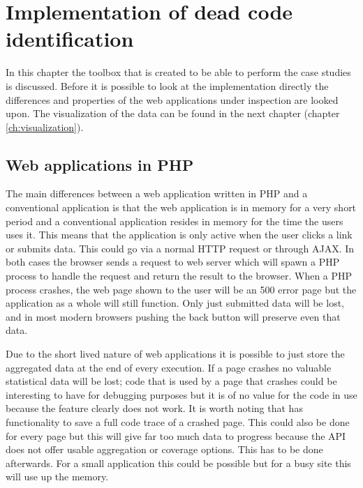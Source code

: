\chapter{Implementation of dead code identification}
\label{ch:implementation}

In this chapter the toolbox that is created to be able to perform the case studies is discussed. Before it is possible to look at the implementation directly the differences and properties of the web applications under inspection are looked upon. The visualization of the data can be found in the next chapter (chapter \ref{ch:visualization}).

\section{Web applications in PHP}

The main differences between a web application written in PHP and a conventional application is that the web application is in memory for a very short period and a conventional application resides in memory for the time the users uses it. This means that the application is only active when the user clicks a link or submits data. This could go via a normal HTTP request or through AJAX\cite{garrett2005}. In both cases the browser sends a request to web server which will spawn a PHP process to handle the request and return the result to the browser. When a PHP process crashes, the web page shown to the user will be an 500 error page but the application as a whole will still function. Only just submitted data will be lost, and in most modern browsers pushing the back button will preserve even that data.

Due to the short lived nature of web applications it is possible to just store the aggregated data at the end of every execution. If a page crashes no valuable statistical data will be lost; code that is used by a page that crashes could be interesting to have for debugging purposes but it is of no value for the code in use because the feature clearly does not work. It is worth noting that  has functionality to save a full code trace of a crashed page. This could also be done for every page but this will give far too much data to progress because the API does not offer usable aggregation or coverage options. This has to be done afterwards. For a small application this could be possible but for a busy site this will use up the memory.

